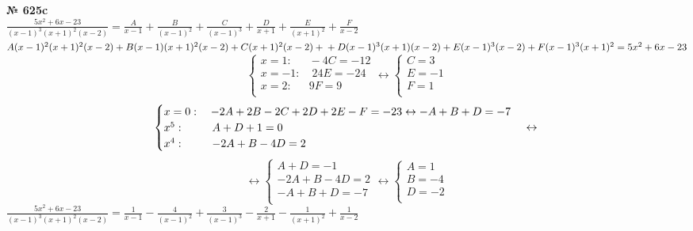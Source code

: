 \documentclass[12pt]{article}
\begin{document}
{
	{\textbf{№ 625c}\vspace{.2cm} \\}
	$\frac{5x^2+6x-23}{(x-1)^3(x+1)^2(x-2)} = \frac{A}{x-1} + \frac{B}{(x-1)^2} + \frac{C}{(x-1)^3} + \frac{D}{x+1} + \frac{E}{(x+1)^2} + \frac{F}{x-2}$\vspace{.2cm}\\
	$A(x-1)^2(x+1)^2(x-2)+B(x-1)(x+1)^2(x-2)+C(x+1)^2(x-2)+\\+D(x-1)^3(x+1)(x-2)+E(x-1)^3(x-2)+F(x-1)^3(x+1)^2=5x^2+6x-23$\\
	\begin{equation}
		\begin{cases}
			x = 1: \quad \enspace -4C=-12\\
			x = -1: \quad 24E=-24\\
			x = 2: \quad \enspace 9F=9\\
		\end{cases}
	\leftrightarrow
	\begin{cases}
		C=3\\E=-1\\ F=1\\
	\end{cases}
	\end{equation}
	\begin{equation}
		\begin{cases}
			x = 0: \quad -2A+2B-2C+2D+2E-F=-23 \leftrightarrow -A+B+D=-7\\
			x^5:\qquad \enspace A+D+1=0\\
			x^4:\qquad \enspace -2A+B-4D=2
		\end{cases}
	\leftrightarrow\\
	\end{equation}
	\begin{equation}
		\leftrightarrow
		\begin{cases}
			A+D=-1\\
			-2A+B-4D=2\\
			-A+B+D=-7\\
		\end{cases}
		\leftrightarrow
		\begin{cases}
			A=1\\
			B=-4\\
			D=-2\\
		\end{cases}
	\end{equation}
	$\frac{5x^2+6x-23}{(x-1)^3(x+1)^2(x-2)} = \frac{1}{x-1} - \frac{4}{(x-1)^2} + \frac{3}{(x-1)^3} - \frac{2}{x+1} - \frac{1}{(x+1)^2} + \frac{1}{x-2}$
}
\end{document}

